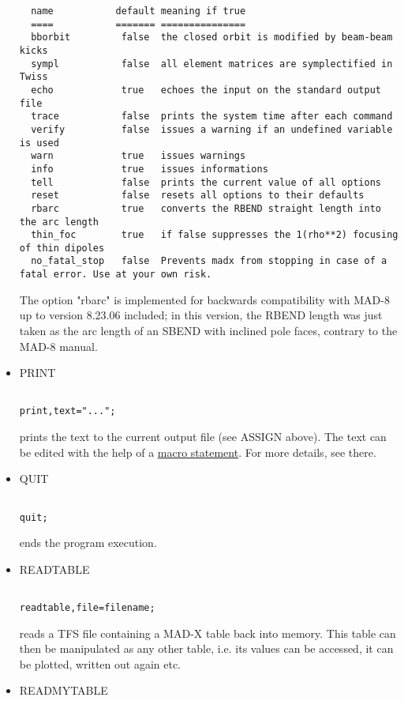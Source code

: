 \begin{itemize}
\begin{verbatim}
  name           default meaning if true
  ====           ======= ===============
  bborbit         false  the closed orbit is modified by beam-beam kicks
  sympl           false  all element matrices are symplectified in Twiss
  echo            true   echoes the input on the standard output file
  trace           false  prints the system time after each command
  verify          false  issues a warning if an undefined variable is used
  warn            true   issues warnings
  info            true   issues informations
  tell            false  prints the current value of all options
  reset           false  resets all options to their defaults
  rbarc           true   converts the RBEND straight length into the arc length
  thin_foc        true   if false suppresses the 1(rho**2) focusing of thin dipoles
  no_fatal_stop   false  Prevents madx from stopping in case of a fatal error. Use at your own risk.
\end{verbatim} The option "rbarc" is implemented for backwards compatibility with MAD-8 up to version 8.23.06 included; in this version, the RBEND length was just taken as the arc length of an SBEND with inclined pole faces,  contrary to the MAD-8 manual. 


	\item PRINT
\begin{verbatim}

print,text="...";
\end{verbatim} prints the text to the current output file (see ASSIGN above). The text can be edited with the help of a  \href{special.html#macro}{macro statement}. For more details, see there. 


	\item QUIT
\begin{verbatim}

quit;
\end{verbatim} ends the program execution. 


	\item READTABLE
\begin{verbatim}

readtable,file=filename;
\end{verbatim} reads a TFS file containing a MAD-X table back into memory. This table can then be manipulated as any other table, i.e. its values can be accessed, it can be plotted, written out again etc. 


	\item READMYTABLE
\begin{verbatim}


\end{verbatim}
\end{itemize}
